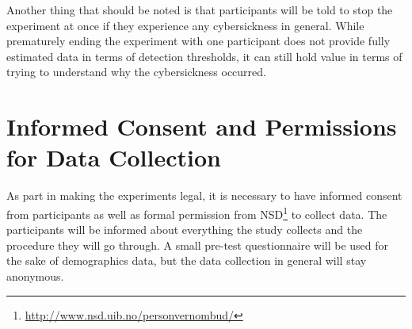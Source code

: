 Another thing that should be noted is that participants will be told to stop the experiment at once if they experience any cybersickness in general. While prematurely ending the experiment with one participant does not provide fully estimated data in terms of detection thresholds, it can still hold value in terms of trying to understand why the cybersickness occurred. 

\section{Informed Consent and Permissions for Data Collection}
As part in making the experiments legal, it is necessary to have informed consent from participants as well as formal permission from NSD\footnote{\url{http://www.nsd.uib.no/personvernombud/}} to collect data. The participants will be informed about everything the study collects and the procedure they will go through. A small pre-test questionnaire will be used for the sake of demographics data, but the data collection in general will stay anonymous.  